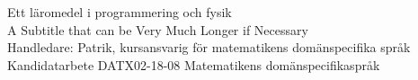 \newpage
\thispagestyle{plain}
\vspace*{4.5cm}
Ett läromedel i programmering och fysik\\
A Subtitle that can be Very Much Longer if Necessary\\

Handledare: Patrik, kursansvarig för matematikens domänspecifika språk\\

Kandidatarbete DATX02-18-08 Matematikens domänspecifikaspråk\\	%

\vfill

